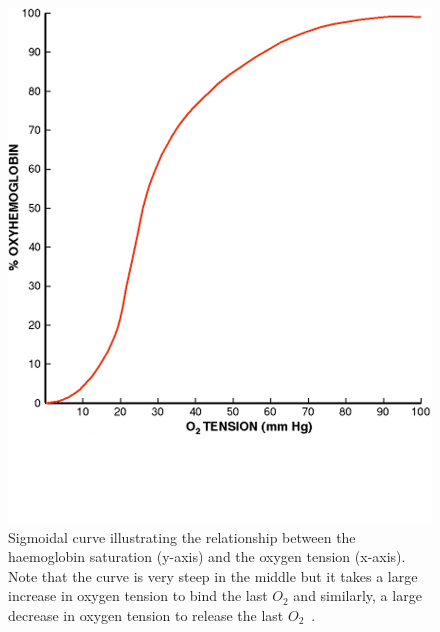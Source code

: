 	\begin{figure}
		\begin{center}
		\includegraphics[width=\textwidth]{./intro/intro-images/HBdis.png}
		\caption{Sigmoidal curve illustrating the relationship between the haemoglobin saturation (y-axis) and the oxygen tension (x-axis). Note that the curve is very steep in the middle but it takes a large increase in oxygen tension to bind the last ${O_2}$ and similarly, a large decrease in oxygen tension to release the last  ${O_2}$~\cite{GomezCambronero:2001hu}.}
		\label{HBdis}
		\end{center}
	\end{figure}	

